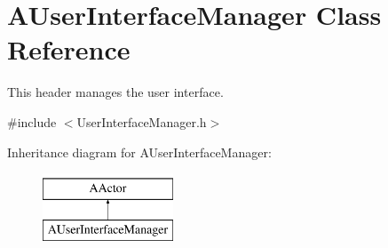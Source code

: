 \section{A\+User\+Interface\+Manager Class Reference}
\label{class_a_user_interface_manager}


This header manages the user interface.  




{\ttfamily \#include $<$User\+Interface\+Manager.\+h$>$}

Inheritance diagram for A\+User\+Interface\+Manager\+:\begin{figure}[H]
\begin{center}
\leavevmode
\includegraphics[height=2.000000cm]{class_a_user_interface_manager}
\end{center}
\end{figure}
